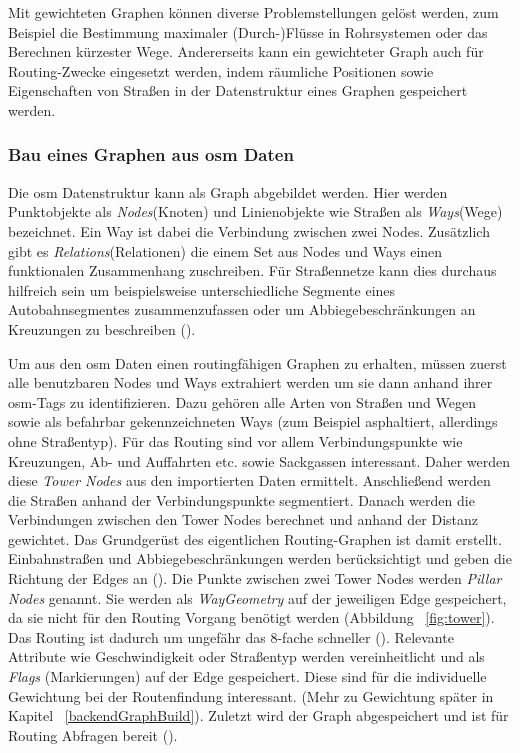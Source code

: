 Mit gewichteten Graphen können diverse Problemstellungen gelöst werden, zum Beispiel die Bestimmung maximaler (Durch-)Flüsse in Rohrsystemen oder das Berechnen kürzester Wege.
Andererseits kann ein gewichteter Graph auch für Routing-Zwecke eingesetzt werden, indem räumliche Positionen sowie Eigenschaften von Straßen in der Datenstruktur eines Graphen gespeichert werden.

\subsubsection{Bau eines Graphen aus \gls{osm} Daten}
\label{sec:osmgraph}

Die \gls{osm} Datenstruktur kann als Graph abgebildet werden.
Hier werden Punktobjekte als \textit{Nodes}(Knoten) und Linienobjekte wie Straßen als \textit{Ways}(Wege) bezeichnet.
Ein Way ist dabei die Verbindung zwischen zwei Nodes.
Zusätzlich gibt es \textit{Relations}(Relationen) die einem Set aus Nodes und Ways einen funktionalen Zusammenhang zuschreiben.
Für Straßennetze kann dies durchaus hilfreich sein um beispielsweise unterschiedliche Segmente eines Autobahnsegmentes zusammenzufassen oder um Abbiegebeschränkungen an Kreuzungen zu beschreiben (\cite{osmrelation}).

Um aus den \gls{osm} Daten einen routingfähigen Graphen zu erhalten, müssen zuerst alle benutzbaren Nodes und Ways extrahiert werden um sie dann anhand ihrer \gls{osm}-Tags zu identifizieren.
Dazu gehören alle Arten von Straßen und Wegen sowie als befahrbar gekennzeichneten Ways (zum Beispiel asphaltiert, allerdings ohne Straßentyp).
Für das Routing sind vor allem Verbindungspunkte wie Kreuzungen, Ab- und Auffahrten etc. sowie Sackgassen interessant.
Daher werden diese \textit{Tower Nodes} aus den importierten Daten ermittelt.
Anschließend werden die Straßen anhand der Verbindungspunkte segmentiert.
Danach werden die Verbindungen zwischen den Tower Nodes berechnet und anhand der Distanz gewichtet.
Das Grundgerüst des eigentlichen Routing-Graphen ist damit erstellt.
Einbahnstraßen und Abbiegebeschränkungen werden berücksichtigt und geben die Richtung der Edges an (\cite{osmgraph}).
Die Punkte zwischen zwei Tower Nodes werden \textit{Pillar Nodes} genannt.
Sie werden als \textit{WayGeometry} auf der jeweiligen Edge gespeichert, da sie nicht für den Routing Vorgang benötigt werden (Abbildung ~\ref{fig:tower}).
Das Routing ist dadurch um ungefähr das 8-fache schneller (\cite{graphhopper}).
Relevante Attribute wie Geschwindigkeit oder Straßentyp werden vereinheitlicht und als \textit{Flags} (Markierungen) auf der Edge gespeichert.
Diese sind für die individuelle Gewichtung bei der Routenfindung interessant.
(Mehr zu Gewichtung später in Kapitel ~\ref{backendGraphBuild}).
Zuletzt wird der Graph abgespeichert und ist für Routing Abfragen bereit (\cite{osmgraph}).

